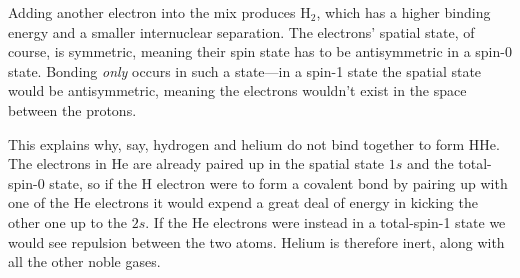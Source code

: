 \documentclass[../p116main.tex]{subfiles}
\begin{document}
Adding another electron into the mix produces $\textrm{H}_2$, which has a higher binding energy and a smaller internuclear separation.
The electrons' spatial state, of course, is symmetric, meaning their spin state has to be antisymmetric in a spin-0 state.
Bonding \textit{only} occurs in such a state---in a spin-1 state the spatial state would be antisymmetric, meaning the electrons wouldn't exist in the space between the protons.

This explains why, say, hydrogen and helium do not bind together to form HHe.
The electrons in He are already paired up in the spatial state $1s$ and the total-spin-0 state, so if the H electron were to form a covalent bond by pairing up with one of the He electrons it would expend a great deal of energy in kicking the other one up to the $2s$.
If the He electrons were instead in a total-spin-1 state we would see repulsion between the two atoms.
Helium is therefore inert, along with all the other noble gases.
\end{document}
